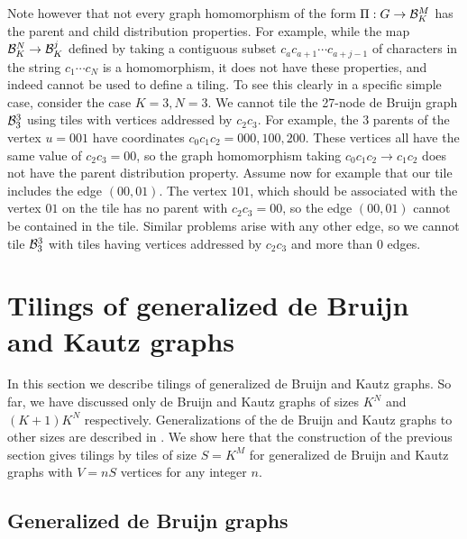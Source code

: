 \documentclass[12pt]{article}
\begin{document}
Note however that not every graph homomorphism of the form $\Pi:G
\rightarrow {\cal B}_K^M$ has the parent and child distribution
properties.  For example, while the map ${\cal B}_K^N \rightarrow{\cal
B}_K^j$ defined by taking a contiguous subset $c_ac_{a +1} \cdots c_{a +
j -1}$ of  characters in the string $c_1 \cdots c_N$
is a homomorphism, it does not have these properties, and indeed
cannot be used to define a tiling.  To see this clearly in a specific
simple case, consider the case $K = 3, N = 3$.  We cannot tile the
27-node de Bruijn graph ${\cal B}_3^3$ using tiles with vertices
addressed by $c_2 c_3$.  For example, the 3 parents of the vertex
$u=001$ have coordinates $c_0c_1 c_2 = 000, 100, 200$.  These vertices
all have the same value of $c_2 c_3 = 00$, so the graph homomorphism
taking $c_0c_1 c_2 \rightarrow c_1 c_2$ does not have the parent
distribution property.  Assume  now for example that our tile includes the
edge $(00, 01)$.  The vertex $101$, which should be associated with
the vertex $01$ on the tile has no parent with $c_2c_3 = 00$, so the
edge $(00, 01)$ cannot be contained in the tile.  Similar problems
arise with any other edge, so we cannot tile ${\cal B}_3^3$ with tiles
having vertices addressed by $c_2c_3$ and more than 0 edges.

\section{Tilings of generalized de Bruijn and Kautz graphs}
\label{sec:generalized}

In this section we describe tilings of generalized de Bruijn and
Kautz graphs.
So far, we have discussed only  de Bruijn  and Kautz graphs
of sizes $K^N$ and $(K + 1)K^N$ respectively.
Generalizations of the de Bruijn and Kautz graphs to other sizes are
described in \cite{ii1, ii2, rpk, dch}.
We show here that the construction of the previous section gives
tilings by tiles of size $S =K^M$  for generalized de Bruijn and Kautz
graphs with $V =nS$ vertices for any integer $n$.  

\subsection{Generalized de Bruijn graphs}
\end{document}
